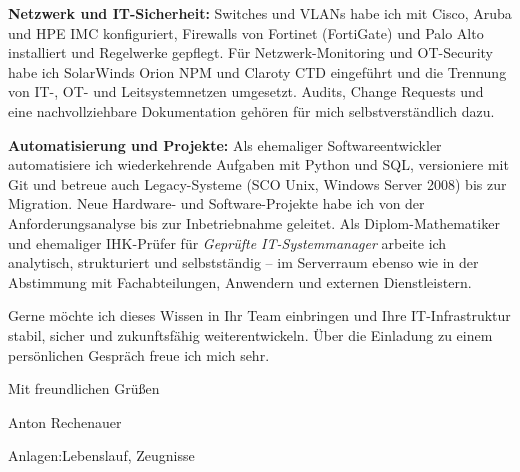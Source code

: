 \documentclass[11pt,a4paper]{article}
\newcommand*{\semibold}{\fontseries{sb}\selectfont}
\newcommand*{\light}{\fontseries{l}\selectfont}
\begin{document}
\textbf{Netzwerk und IT-Sicherheit:} Switches und VLANs habe ich mit Cisco, Aruba und HPE IMC
konfiguriert, Firewalls von Fortinet (FortiGate) und Palo Alto installiert und Regelwerke
gepflegt. Für Netzwerk-Monitoring und OT-Security habe ich SolarWinds Orion NPM und Claroty CTD
eingeführt und die Trennung von IT-, OT- und Leitsystemnetzen umgesetzt. Audits, Change
Requests und eine nachvollziehbare Dokumentation gehören für mich selbstverständlich dazu.

\textbf{Automatisierung und Projekte:} Als ehemaliger Softwareentwickler automatisiere ich
wiederkehrende Aufgaben mit Python und SQL, versioniere mit Git und betreue auch
Legacy-Systeme (SCO Unix, Windows Server 2008) bis zur Migration. Neue Hardware- und
Software-Projekte habe ich von der Anforderungsanalyse bis zur Inbetriebnahme geleitet. Als
Diplom-Mathematiker und ehemaliger IHK-Prüfer für \emph{Geprüfte IT-Systemmanager} arbeite ich
analytisch, strukturiert und selbstständig -- im Serverraum ebenso wie in der Abstimmung mit
Fachabteilungen, Anwendern und externen Dienstleistern.

Gerne möchte ich dieses Wissen in Ihr Team einbringen und Ihre IT-Infrastruktur
stabil, sicher und zukunftsfähig weiterentwickeln.%
%
Über die Einladung zu einem persönlichen Gespräch freue ich mich sehr.

Mit freundlichen Grüßen

\vspace{1.0cm}
Anton Rechenauer

\vfill
{\small\color{muted}\semibold Anlagen:\enspace\light Lebenslauf, Zeugnisse}
\end{document}
